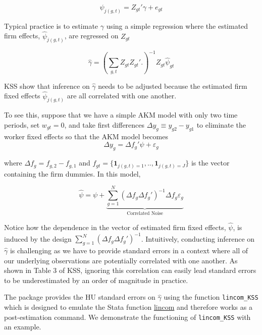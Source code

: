 \documentclass[11pt]{article}
\begin{document}
\begin{equation}
\psi_{j(g,t)}=Z_{gt}'\gamma+e_{gt}
\end{equation}

Typical practice is to estimate \(\gamma\) using a simple regression
where the estimated firm effects, \(\hat{\psi}_{j(g,t)}\), are regressed
on \(Z_{gt}\)

\begin{equation}
\hat{\gamma}=\left(\sum_{g,t}Z_{gt}Z_{gt}'.
\right)^{-1}Z_{gt}\hat{\psi}_{gt}
\end{equation}

KSS show that inference on \(\hat{\gamma}\) needs to be adjusted because the estimated firm fixed effects \(\hat{\psi}_{j(g,t)}\) are all correlated with one another.

To see this, suppose that we have a simple AKM model with only two time
periods, set \(w_{gt}=0\), and take first differences
\(\Delta y_{g}\equiv y_{g2}-y_{g1}\) to eliminate the worker fixed
effects so that the AKM model becomes \begin{equation}
\Delta y_{g}=\Delta f_{g}'\psi+\varepsilon_{g}
\end{equation}

where \(\Delta f_{g}=f_{g,2}-f_{g,1}\) and
\(f_{gt}=\{\mathbf{1}_{j(g,t)=1},..,\mathbf{1}_{j(g,t)=J}\}\) is the
vector containing the firm dummies. In this model,

\begin{equation}
\hat{\psi}=\psi+\underbrace{\sum_{g=1}^{N}(\Delta f_{g}\Delta f_{g}')^{-1}\Delta f_{g}\varepsilon_{g}}_{\text{Correlated Noise}}
\end{equation}

Notice how the dependence in the vector of estimated firm fixed effects,
\(\hat{\psi}\), is induced by the design
\(\sum_{g=1}^{N}(\Delta f_{g}\Delta f_{g}')^{-1}\). Intuitively,
conducting inference on \(\hat{\gamma}\) is challenging as we have to
provide standard errors in a context where all of our underlying
observations are potentially correlated with one another. As shown in
Table 3 of KSS, ignoring this correlation can easily lead standard
errors to be underestimated by an order of magnitude in practice.

The package provides the HU standard errors on \(\hat{\gamma}\)
using the function \texttt{lincom\_KSS} which is designed to emulate the Stata
function \href{https://www.stata.com/manuals13/rlincom.pdf}{lincom} and therefore works as a post-estimation
command. We demonstrate the functioning of \texttt{lincom\_KSS} with an
example.
\end{document}
